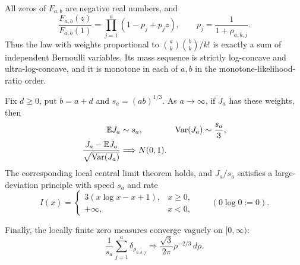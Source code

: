 \begin{theorem}
\label{thm:poisson-binomial}
All zeros of \(F_{a,b}\) are negative real numbers, and
\begin{equation}\label{eq:Poisson-binomial-factor}
 \frac{F_{a,b}(z)}{F_{a,b}(1)}
 =\prod_{j=1}^a(1-p_j+p_jz),
 \qquad p_j=\frac1{1+\rho_{a,b,j}}.
\end{equation}
Thus the law with weights proportional to
\(\binom ak\binom bk/k!\) is exactly a sum of independent Bernoulli
variables.  Its mass sequence is strictly log-concave and ultra-log-concave,
and it is monotone in each of \(a,b\) in the monotone-likelihood-ratio order.

Fix \(d\ge0\), put \(b=a+d\) and \(s_a=(ab)^{1/3}\).  As \(a\to\infty\),
if \(J_a\) has these weights, then
\begin{align}
 \mathbb EJ_a&\sim s_a,&
 \operatorname{Var}(J_a)&\sim\frac{s_a}{3},
 \label{eq:Ja-mean-var}\\
 \frac{J_a-\mathbb EJ_a}{\sqrt{\operatorname{Var}(J_a)}}&\Longrightarrow N(0,1).
 \label{eq:Ja-CLT}
\end{align}
The corresponding local central limit theorem holds, and \(J_a/s_a\)
satisfies a large-deviation principle with speed \(s_a\) and rate
\begin{equation}\label{eq:Ja-rate}
 I(x)=
 \begin{cases}
 3(x\log x-x+1),&x\ge0,\\
 +\infty,&x<0,
 \end{cases}
 \qquad(0\log0:=0).
\end{equation}

Finally, the locally finite zero measures converge vaguely on
\([0,\infty)\):
\begin{equation}\label{eq:zero-density-limit}
 \boxed{\displaystyle
 \frac1{s_a}\sum_{j=1}^a\delta_{\rho_{a,b,j}}
 \Longrightarrow
 \frac{\sqrt3}{2\pi}\rho^{-2/3}\,d\rho.}
\end{equation}
\end{theorem}

